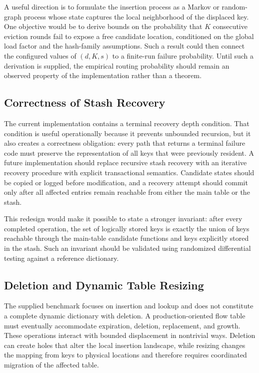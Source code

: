 \documentclass[conference]{IEEEtran}
\begin{document}
A useful direction is to formulate the insertion process as a Markov or random-graph process whose state captures the local neighborhood of the displaced key. One objective would be to derive bounds on the probability that $K$ consecutive eviction rounds fail to expose a free candidate location, conditioned on the global load factor and the hash-family assumptions. Such a result could then connect the configured values of $(d,K,s)$ to a finite-run failure probability. Until such a derivation is supplied, the empirical routing probability should remain an observed property of the implementation rather than a theorem.

\subsection{Correctness of Stash Recovery}

The current implementation contains a terminal recovery depth condition. That condition is useful operationally because it prevents unbounded recursion, but it also creates a correctness obligation: every path that returns a terminal failure code must preserve the representation of all keys that were previously resident. A future implementation should replace recursive stash recovery with an iterative recovery procedure with explicit transactional semantics. Candidate states should be copied or logged before modification, and a recovery attempt should commit only after all affected entries remain reachable from either the main table or the stash.

This redesign would make it possible to state a stronger invariant: after every completed operation, the set of logically stored keys is exactly the union of keys reachable through the main-table candidate functions and keys explicitly stored in the stash. Such an invariant should be validated using randomized differential testing against a reference dictionary.

\subsection{Deletion and Dynamic Table Resizing}

The supplied benchmark focuses on insertion and lookup and does not constitute a complete dynamic dictionary with deletion. A production-oriented flow table must eventually accommodate expiration, deletion, replacement, and growth. These operations interact with bounded displacement in nontrivial ways. Deletion can create holes that alter the local insertion landscape, while resizing changes the mapping from keys to physical locations and therefore requires coordinated migration of the affected table.
\end{document}
